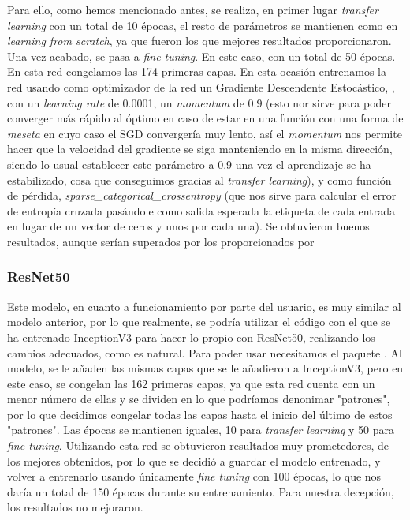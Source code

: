 Para ello, como hemos mencionado antes, se realiza, en primer lugar \textit{transfer learning} con un total de 10 épocas, el resto de parámetros se mantienen como en \textit{learning from scratch}, ya que fueron los que mejores resultados proporcionaron. Una vez acabado, se pasa a \textit{fine tuning}. En este caso, con un total de 50 épocas. En esta red congelamos las 174 primeras capas. En esta ocasión entrenamos la red usando como optimizador de la red un Gradiente Descendente Estocástico, , con un \textit{learning rate} de 0.0001, un \textit{momentum} de 0.9 (esto nor sirve para poder converger más rápido al óptimo en caso de estar en una función con una forma de \textit{meseta} en cuyo caso el SGD convergería muy lento, así el \textit{momentum} nos permite hacer que la velocidad del gradiente se siga manteniendo en la misma dirección, siendo lo usual establecer este parámetro a 0.9 una vez el aprendizaje se ha estabilizado, cosa que conseguimos gracias al \textit{transfer learning}), y como función de pérdida, \textit{sparse\_categorical\_crossentropy} (que nos sirve para calcular el error de entropía cruzada pasándole como salida esperada la etiqueta de cada entrada en lugar de un vector de ceros y unos por cada una). Se obtuvieron buenos resultados, aunque serían superados por los proporcionados por 

\subsubsection{ResNet50}

Este modelo, en cuanto a funcionamiento por parte del usuario, es muy similar al modelo anterior, por lo que realmente, se podría utilizar el código con el que se ha entrenado InceptionV3 para hacer lo propio con ResNet50, realizando los cambios adecuados, como es natural. Para poder usar  necesitamos el paquete . Al modelo, se le añaden las mismas capas que se le añadieron a InceptionV3, pero en este caso, se congelan las 162 primeras capas, ya que esta red cuenta con un menor número de ellas y se dividen en lo que podríamos denonimar "patrones", por lo que decidimos congelar todas las capas hasta el inicio del último de estos "patrones". Las épocas se mantienen iguales, 10 para \textit{transfer learning} y 50 para \textit{fine tuning}. Utilizando esta red se obtuvieron resultados muy prometedores, de los mejores obtenidos, por lo que se decidió a guardar el modelo entrenado, y volver a entrenarlo usando únicamente \textit{fine tuning} con 100 épocas, lo que nos daría un total de 150 épocas durante su entrenamiento. Para nuestra decepción, los resultados no mejoraron.\\

